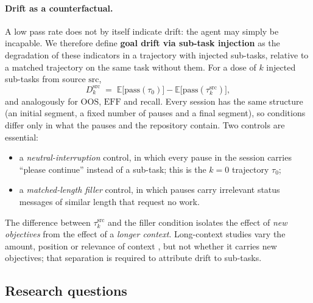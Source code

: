 \paragraph{Drift as a counterfactual.} A low pass rate does not by itself indicate drift: the agent
may simply be incapable. We therefore define \textbf{goal drift via sub-task injection} as the
degradation of these indicators in a trajectory with injected sub-tasks, relative to a matched
trajectory on the same task without them. For a dose of $k$ injected sub-tasks from source
$\mathrm{src}$,
\begin{equation}
  D_k^{\mathrm{src}} \;=\; \mathbb{E}\big[\mathrm{pass}(\tau_0)\big]-\mathbb{E}\big[\mathrm{pass}(\tau_k^{\mathrm{src}})\big],
\end{equation}
and analogously for $\mathrm{OOS}$, $\mathrm{EFF}$ and recall. Every session has the same structure (an initial segment, a fixed number of pauses and a final
segment), so conditions differ only in what the pauses and the repository contain. Two controls are
essential:
\begin{itemize}
  \item a \emph{neutral-interruption} control, in which every pause in the session carries
        ``please continue'' instead of a sub-task; this is the $k=0$ trajectory $\tau_0$;
  \item a \emph{matched-length filler} control, in which pauses carry irrelevant status messages of
        similar length that request no work.
\end{itemize}
The difference between $\tau_k^{\mathrm{src}}$ and the filler condition isolates the effect of
\emph{new objectives} from the effect of a \emph{longer context}. Long-context studies vary the
amount, position or relevance of context \citep{liu2024lost,xue2026contextrot}, but not whether it
carries new objectives; that separation is required to attribute drift to sub-tasks.

\subsection{Research questions}

